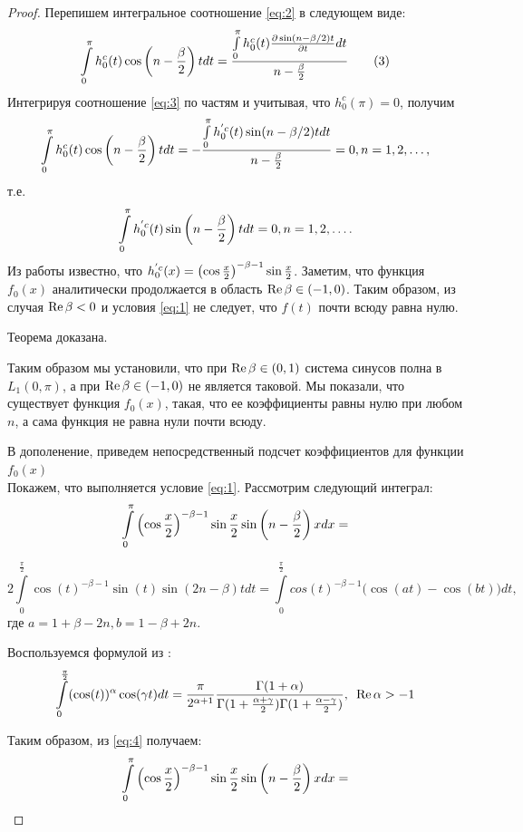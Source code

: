 ﻿\documentclass[oneside, final, 14pt]{extreport}
\begin{document}
\begin{proof}
		Перепишем интегральное соотношение \eqref{eq:2} в следующем виде:
		\begin{equation}
			\int\limits_0^\pi h^c_0(t)\cos\left(n - \frac{\beta}{2}\right)tdt = 
			\frac{\int\limits_0^\pi h^c_0(t)\frac{\partial\sin(n - \beta / 2)t}{\partial t}dt}{n - \frac{\beta}{2}}
			\tag{3}\label{eq:3}
		\end{equation}
		Интегрируя соотношение \eqref{eq:3} по частям и учитывая, что $h^c_0(\pi) = 0$, получим
		$$
			\int\limits_0^\pi h^c_0(t)\cos\left(n - \frac{\beta}{2}\right)tdt = 
			-\frac{\int\limits_0^\pi h^{'c}_0(t)\sin(n - \beta / 2)tdt}{n - \frac{\beta}{2}} = 0, n = 1,2, \ldots,
		$$
		т.е.
		$$
			\int\limits_0^\pi h^{'c}_0(t)\sin\left(n - \frac{\beta}{2}\right)tdt = 0, n = 1, 2, \ldots.
		$$
		Из работы \cite{moiseev-2018} известно, что $h^{'c}_0(x) = \left(\cos\frac{x}{2}\right)^{-\beta-1}\sin\frac{x}{2}$. 
		Заметим, что функция $f_0(x)$ аналитически продолжается в область $\operatorname{Re}\beta \in (-1, 0)$. 
		Таким образом, из случая $\operatorname{Re}{\beta} < 0$ и условия \eqref{eq:1} не следует, что $f(t)$ почти всюду равна нулю.
		
		Теорема доказана.
		
		\bigskip
		Таким образом мы установили, что при $\operatorname{Re}{\beta} \in (0, 1)$ система синусов полна в $L_1(0, \pi)$, а при 
		$\operatorname{Re}{\beta} \in (-1, 0)$ не является таковой. Мы показали, что существует функция $f_0(x)$, такая, что ее 
		коэффициенты равны нулю при любом $n$, а сама функция не равна нули почти всюду.
		
		В дополенение, приведем непосредственный подсчет коэффициентов для функции $f_0(x)$\\
		Покажем, что выполняется условие \eqref{eq:1}. Рассмотрим следующий интеграл:
		$$
			\int\limits_0^\pi\left(\cos\frac{x}{2}\right)^{-\beta-1}\sin\frac{x}{2}\sin\left(n - \frac{\beta}{2}\right)xdx = 
		$$
		
		\begin{equation}
			2\int\limits_0^\frac{\pi}{2}\cos(t)^{-\beta - 1}\sin(t)\sin(2n - \beta)tdt 
			= \int\limits_0^\frac{\pi}{2}cos(t)^{-\beta-1}\bigl(\cos(at) - \cos(bt)\bigr)dt,	\tag{4} \label{eq:4}
		\end{equation}
		где $a =1 + \beta - 2n, b = 1 - \beta + 2n.$
		
		
		
		\bigskip
		
		Воспользуемся формулой из \cite{bateman}:
		$$
			\int\limits_0^\frac{\pi}{2}(\cos(t))^\alpha \cos(\gamma t)dt = \frac{\pi}{2^{\alpha + 1}}
			\frac{\Gamma(1 + \alpha)}{\Gamma(1 + \frac{\alpha + \gamma}{2})\Gamma(1 + \frac{\alpha - \gamma}{2})},
			\enspace\operatorname{Re}\alpha > -1
		$$
		
		Таким образом, из \eqref{eq:4} получаем:
		$$
			\int\limits_0^\pi\left(\cos\frac{x}{2}\right)^{-\beta-1}\sin\frac{x}{2}\sin\left(n - \frac{\beta}{2}\right)xdx = 
		$$
		

\end{proof}
\end{document}
